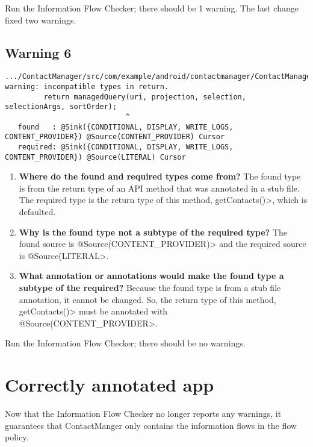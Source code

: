    Run the Information Flow Checker; there should be 1 warning.  The last change fixed two warnings.
    
  \subsection{Warning 6}
   \begin{Verbatim}
.../ContactManager/src/com/example/android/contactmanager/ContactManager.java:118: 
warning: incompatible types in return.
         return managedQuery(uri, projection, selection, selectionArgs, sortOrder);
                            ^
   found   : @Sink({CONDITIONAL, DISPLAY, WRITE_LOGS, CONTENT_PROVIDER}) @Source(CONTENT_PROVIDER) Cursor
   required: @Sink({CONDITIONAL, DISPLAY, WRITE_LOGS, CONTENT_PROVIDER}) @Source(LITERAL) Cursor
    \end{Verbatim} 

 \begin{enumerate}

\item\textbf{Where do the found and required types come from?}
   The found type is from the return type of an API method that was annotated in a stub file.  The required type is the return type of this method, \<getContacts()>, which is defaulted. 
  \item\textbf{ Why is the found type not a subtype of the required type?}
  The found source is \<@Source(CONTENT\_PROVIDER)> and the required source is 
  \<@Source(LITERAL>.
  \item\textbf{What annotation or annotations would make the found type a subtype of the required?}
  Because the found type is from a stub file annotation, it cannot be changed. So, the return type of this method, \<getContacts()> must be annotated with 
  \<@Source(CONTENT\_PROVIDER>.\newline
  
              \end{enumerate}

    Run the Information Flow Checker; there should be no warnings.
  \section{Correctly annotated app}  
     Now that the Information Flow Checker no longer reports any warnings, it guarantees that
     ContactManger only contains the information flows in the flow policy.  

 
%
%
%
%
